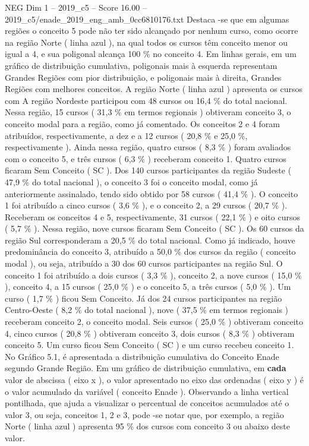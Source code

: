 \begin{textsample}{NEG Dim 1 – 2019\_c5 – Score 16.00 – 2019\_c5/enade\_2019\_eng\_amb\_0cc6810176.txt}
Destaca -se que em algumas regiões o conceito 5 pode não ter sido alcançado por nenhum curso, como ocorre na região Norte ( linha azul ), na qual todos os cursos têm conceito menor ou igual a 4, e sua poligonal alcança 100 \% no conceito 4.
Em linhas gerais, em um gráfico de distribuição cumulativa, poligonais mais à esquerda representam Grandes Regiões com pior distribuição, e poligonais mais à direita, Grandes Regiões com melhores conceitos.
A região Norte ( linha azul ) apresenta os cursos com A região Nordeste participou com 48 cursos ou 16,4 \% do total nacional.
Nessa região, 15 cursos ( 31,3 \% em termos regionais ) obtiveram conceito 3, o conceito modal para a região, como já comentado.
Os conceitos 2 e 4 foram atribuídos, respectivamente, a dez e a 12 cursos ( 20,8 \% e 25,0 \%, respectivamente ).
Ainda nessa região, quatro cursos ( 8,3 \% ) foram avaliados com o conceito 5, e três cursos ( 6,3 \% ) receberam conceito 1.
Quatro cursos ficaram Sem Conceito ( SC ).
Dos 140 cursos participantes da região Sudeste ( 47,9 \% do total nacional ), o conceito 3 foi o conceito modal, como já anteriormente assinalado, tendo sido obtido por 58 cursos ( 41,4 \% ).
O conceito 1 foi atribuído a cinco cursos ( 3,6 \% ), e o conceito 2, a 29 cursos ( 20,7 \% ).
Receberam os conceitos 4 e 5, respectivamente, 31 cursos ( 22,1 \% ) e oito cursos ( 5,7 \% ).
Nessa região, nove cursos ficaram Sem Conceito ( SC ).
Os 60 cursos da região Sul corresponderam a 20,5 \% do total nacional.
Como já indicado, houve predominância do conceito 3, atribuído a 50,0 \% dos cursos da região ( conceito modal ), ou seja, atribuído a 30 dos 60 cursos participantes na região Sul.
O conceito 1 foi atribuído a dois cursos ( 3,3 \% ), conceito 2, a nove cursos ( 15,0 \% ), conceito 4, a 15 cursos ( 25,0 \% ) e o conceito 5, a três cursos ( 5,0 \% ).
Um curso ( 1,7 \% ) ficou Sem Conceito.
Já dos 24 cursos participantes na região Centro-Oeste ( 8,2 \% do total nacional ), nove ( 37,5 \% em termos regionais ) receberam conceito 2, o conceito modal.
Seis cursos ( 25,0 \% ) obtiveram conceito 4, cinco cursos ( 20,8 \% ) obtiveram conceito 3, dois cursos ( 8,3 \% ) obtiveram conceito 5.
Um curso ficou Sem Conceito ( SC ) e um curso recebeu conceito 1.
No Gráfico 5.1, é apresentada a distribuição cumulativa do Conceito Enade segundo Grande Região.
Em um gráfico de distribuição cumulativa, em \textbf{cada} valor de abscissa ( eixo x ), o valor apresentado no eixo das ordenadas ( eixo y ) é o valor acumulado da variável ( conceito Enade ).
Observando a linha vertical pontilhada, que ajuda a visualizar o percentual de conceitos acumulados até o valor 3, ou seja, conceitos 1, 2 e 3, pode -se notar que, por exemplo, a região Norte ( linha azul ) apresenta 95 \% dos cursos com conceito 3 ou abaixo deste valor.

\end{textsample}
